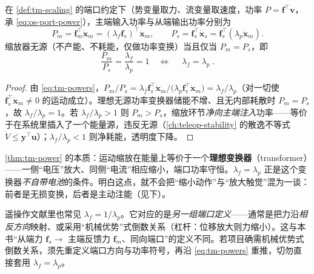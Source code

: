 \begin{theorem}[缩放的能量一致条件]\label{thm:tm-power}
在 \cref{def:tm-scaling} 的端口约定下（势变量取力、流变量取速度，功率 $P=\mathbf{f}^\top\mathbf{v}$，承 \cref{eq:os-port-power}），主端输入功率与从端输出功率分别为
\begin{equation}
  P_m=\mathbf{f}_m^\top\dot{\mathbf{x}}_m=(\lambda_f\mathbf{f}_s)^\top\dot{\mathbf{x}}_m,\qquad
  P_s=\mathbf{f}_s^\top\dot{\mathbf{x}}_s=\mathbf{f}_s^\top(\lambda_p\dot{\mathbf{x}}_m).
  \label{eq:tm-powers}
\end{equation}
缩放器无源（不产能、不耗能，仅做功率变换）当且仅当 $P_m=P_s$，即
\begin{equation}
  \frac{P_m}{P_s}=\frac{\lambda_f}{\lambda_p}=1
  \quad\Longleftrightarrow\quad
  \boxed{\;\lambda_f=\lambda_p\;}.
  \label{eq:tm-energy-cond}
\end{equation}
\end{theorem}
\begin{proof}
由 \cref{eq:tm-powers}，$P_m/P_s=\lambda_f\mathbf{f}_s^\top\dot{\mathbf{x}}_m\big/\big(\lambda_p\mathbf{f}_s^\top\dot{\mathbf{x}}_m\big)=\lambda_f/\lambda_p$（对一切使 $\mathbf{f}_s^\top\dot{\mathbf{x}}_m\neq 0$ 的运动成立）。理想无源功率变换器储能不增、且无内部耗散时 $P_m=P_s$，故 $\lambda_f/\lambda_p=1$。若 $\lambda_f/\lambda_p>1$ 则 $P_m>P_s$，缩放环节\emph{净向主端注入}功率——等价于在系统里插入了一个能量源，违反无源（\cref{ch:teleop-stability} 的散逸不等式 $\dot V\le \mathbf{y}^\top\mathbf{u}$）；$\lambda_f/\lambda_p<1$ 则净耗能，透明度下降。
\end{proof}

\begin{insight}\label{ins:tm-transformer}
\cref{thm:tm-power} 的本质：运动缩放在能量上等价于一个\textbf{理想变换器}（transformer）——一侧“电压”放大、同侧“电流”相应缩小，端口功率守恒。$\lambda_f=\lambda_p$ 正是这个变换器\emph{不自带电池}的条件。明白这点，就不会把“缩小动作”与“放大触觉”混为一谈：前者是无损变换，后者是主动注能（见下）。
\end{insight}

\begin{note}[源约定差异：$\lambda_f=1/\lambda_p$ 从何而来]
遥操作文献里也常见 $\lambda_f=1/\lambda_p$。它对应的是\emph{另一组端口定义}——通常是把力沿\emph{相反方向}映射、或采用“机械优势”式倒数关系（杠杆：位移放大则力缩小）。这与本书“从端力 $\mathbf{f}_s\to$ 主端反馈力 $\mathbf{f}_m$、同向端口”的定义不同。若项目确需机械优势式倒数关系，须先重定义端口方向与功率符号，再沿 \cref{eq:tm-powers} 重推，切勿直接套用 $\lambda_f=\lambda_p$。
\end{note}

